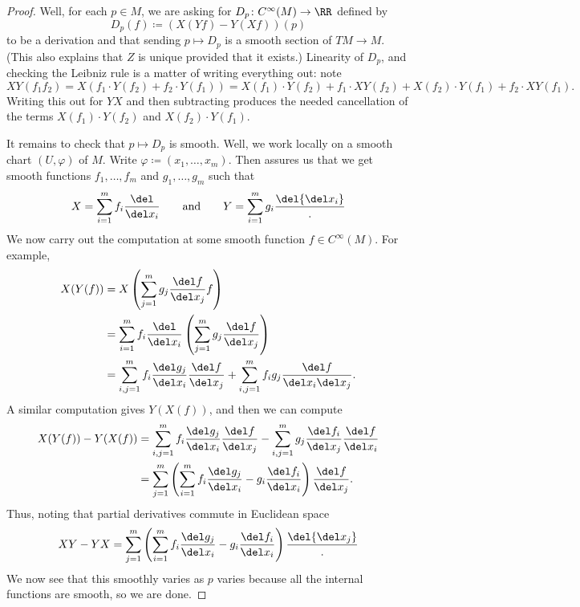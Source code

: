 \documentclass[../notes.tex]{subfiles}
\begin{document}
\begin{proof}
	Well, for each $p\in M$, we are asking for $D_p\colon C^\infty(M)\to\RR$ defined by
	\[D_p(f)\coloneqq (X(Yf)-Y(Xf))(p)\]
	to be a derivation and that sending $p\mapsto D_p$ is a smooth section of $TM\to M$. (This also explains that $Z$ is unique provided that it exists.) Linearity of $D_p$, and checking the Leibniz rule is a matter of writing everything out: note
	\[XY(f_1f_2)=X(f_1\cdot Y(f_2)+f_2\cdot Y(f_1))=X(f_1)\cdot Y(f_2)+f_1\cdot XY(f_2)+X(f_2)\cdot Y(f_1)+f_2\cdot XY(f_1).\]
	Writing this out for $YX$ and then subtracting produces the needed cancellation of the terms $X(f_1)\cdot Y(f_2)$ and $X(f_2)\cdot Y(f_1)$.

	It remains to check that $p\mapsto D_p$ is smooth. Well, we work locally on a smooth chart $(U,\varphi)$ of $M$. Write $\varphi\coloneqq(x_1,\ldots,x_m)$. Then  assures us that we get smooth functions $f_1,\ldots,f_m$ and $g_1,\ldots,g_m$ such that
	\[X=\sum_{i=1}^mf_i\frac{\del}{\del x_i}\qquad\text{and}\qquad Y=\sum_{i=1}^mg_i\frac\del{\del x_i}.\]
	We now carry out the computation at some smooth function $f\in C^\infty(M)$. For example,
	\begin{align*}
		X(Y(f)) &= X\left(\sum_{j=1}^mg_j\frac{\del f}{\del x_j}f\right) \\
		&= \sum_{i=1}^mf_i\frac{\del}{\del x_i}\left(\sum_{j=1}^mg_j\frac{\del f}{\del x_j}\right) \\
		&= \sum_{i,j=1}^mf_i\frac{\del g_j}{\del x_i}\frac{\del f}{\del x_j}+\sum_{i,j=1}^mf_ig_j\frac{\del f}{\del x_i\del x_j}.
	\end{align*}
	A similar computation gives $Y(X(f))$, and then we can compute
	\begin{align*}
		X(Y(f))-Y(X(f)) &= \sum_{i,j=1}^mf_i\frac{\del g_j}{\del x_i}\frac{\del f}{\del x_j}-\sum_{i,j=1}^mg_j\frac{\del f_i}{\del x_j}\frac{\del f}{\del x_i} \\
		&= \sum_{j=1}^m\left(\sum_{i=1}^mf_i\frac{\del g_j}{\del x_i}-g_i\frac{\del f_i}{\del x_i}\right)\frac{\del f}{\del x_j}.
	\end{align*}
	Thus, noting that partial derivatives commute in Euclidean space
	\begin{equation}
		XY-YX=\sum_{j=1}^m\left(\sum_{i=1}^mf_i\frac{\del g_j}{\del x_i}-g_i\frac{\del f_i}{\del x_i}\right)\frac\del{\del x_j}. \label{ex:local-lie-bracket}
	\end{equation}
	We now see that this smoothly varies as $p$ varies because all the internal functions are smooth, so we are done.
\end{proof}
\end{document}
